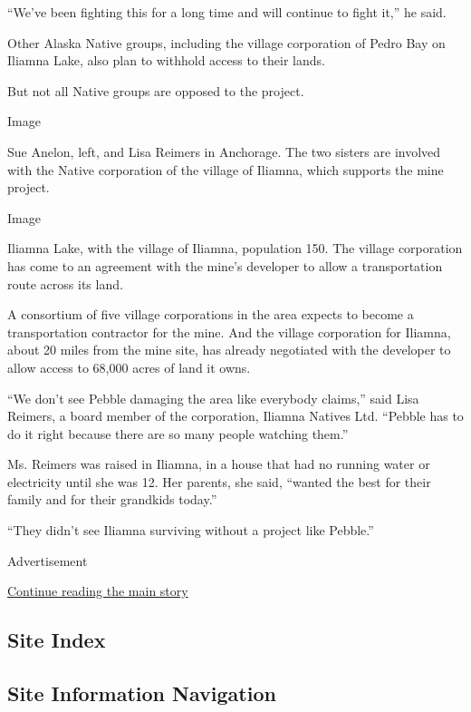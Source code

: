 ``We've been fighting this for a long time and will continue to fight
it,'' he said.

Other Alaska Native groups, including the village corporation of Pedro
Bay on Iliamna Lake, also plan to withhold access to their lands.

But not all Native groups are opposed to the project.

Image

Sue Anelon, left, and Lisa Reimers in Anchorage. The two sisters are
involved with the Native corporation of the village of Iliamna, which
supports the mine project.

Image

Iliamna Lake, with the village of Iliamna, population 150. The village
corporation has come to an agreement with the mine's developer to allow
a transportation route across its land.

A consortium of five village corporations in the area expects to become
a transportation contractor for the mine. And the village corporation
for Iliamna, about 20 miles from the mine site, has already negotiated
with the developer to allow access to 68,000 acres of land it owns.

``We don't see Pebble damaging the area like everybody claims,'' said
Lisa Reimers, a board member of the corporation, Iliamna Natives Ltd.
``Pebble has to do it right because there are so many people watching
them.''

Ms. Reimers was raised in Iliamna, in a house that had no running water
or electricity until she was 12. Her parents, she said, ``wanted the
best for their family and for their grandkids today.''

``They didn't see Iliamna surviving without a project like Pebble.''

Advertisement

\protect\hyperlink{after-bottom}{Continue reading the main story}

\hypertarget{site-index}{%
\subsection{Site Index}\label{site-index}}

\hypertarget{site-information-navigation}{%
\subsection{Site Information
Navigation}\label{site-information-navigation}}

